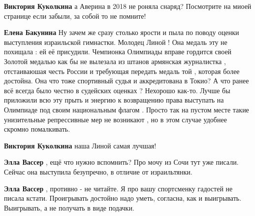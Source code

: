 \begin{itemize}
\begin{itemize}
\textbf{Виктория Куколкина} а Аверина в 2018 не роняла снаряд? Посмотрите на миоей странице если забыли, за собой то не помните!

 
\textbf{Елена Бакунина} Ну зачем же сразу столько ярости и пыла по поводу
оценки выступления израильской гимнастки. Молодец Линой ! Она медаль эту не
похищала : ей её присудили. Чемпионка Олимпиады вправе гордится своей Золотой
медалью как бы не вылезала из штанов армянская журналистка , отстаиваюшая честь
России и требующая передать медаль той , которая более достойна. Она что тоже
спортивный судья и аккредитована в Токио? А что ранее всё всегда было честно в
судейских оценках ? Нехорошо как-то. Лучше бы приложили всю эту прыть и энергию
к возвращению права выступать на Олимпиаде под своим национальным флагом .
Просто так на пустом месте такие унизительные репрессивные мер не возникают ,
но в этом случае удобнее скромно помалкивать.

 
\textbf{Виктория Куколкина} наша Линой самая лучшая!

 
\textbf{Элла Вассер} , ещё что нужно вспомнить? Про мочу из Сочи тут уже писали. Сейчас она выступила безупречно, в отличие от израильтянки.

 
\textbf{Элла Вассер} , противно - не читайте. Я про вашу спортсменку гадостей не писала кстати. Проигрывать достойно надо уметь, согласна, как и выигрывать. Выигрывать, а не получать в виде подачки.


\end{itemize}
\end{itemize}
